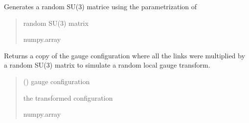 \documentclass[letterpaper,10pt,english]{sphinxmanual}
\begin{document}
\begin{fulllineitems}
\label{\detokenize{gauge_su3:gauge_su3.mat_rand_su3}}
\pysigstartsignatures
\pysiglinewithargsret
{}
{}
{}
\pysigstopsignatures
\sphinxAtStartPar
Generates a random SU(3) matrice using the parametrization of 
\begin{quote}\begin{description}
\sphinxAtStartPar
random SU(3) matrix

\sphinxAtStartPar
numpy.array

\end{description}\end{quote}

\end{fulllineitems}


\begin{fulllineitems}
\label{\detokenize{gauge_su3:gauge_su3.random}}
\pysigstartsignatures
\pysiglinewithargsret
{}
{}
{}
\pysigstopsignatures
\end{fulllineitems}


\begin{fulllineitems}
\label{\detokenize{gauge_su3:gauge_su3.transf_gauge}}
\pysigstartsignatures
\pysiglinewithargsret
{}
{}
{}
\pysigstopsignatures
\sphinxAtStartPar
Returns a copy of the gauge configuration where all the links were multiplied by a random SU(3) matrix to simulate a random local gauge transform.
\begin{quote}\begin{description}
\sphinxAtStartPar
{} () \textendash{} gauge configuration

\sphinxAtStartPar
the transformed configuration

\sphinxAtStartPar
numpy.array

\end{description}\end{quote}

\end{fulllineitems}
\end{document}
